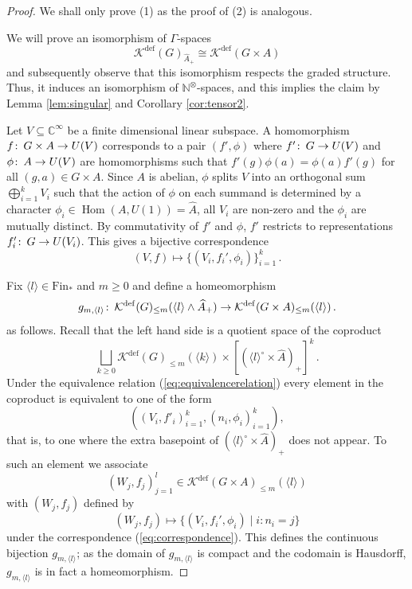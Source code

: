 \documentclass[10pt,a4paper]{amsart}
\DeclareMathOperator{\Hom}{Hom}
\newcommand{\C}{\mathbb{C}}
\newcommand{\Fin}{\mathrm{Fin}}
\newcommand{\Kdef}{\mathcal{K}^{\mathrm{def}}}
\newcommand{\N}{\mathbb{N}}
\newcommand{\co}{\colon\thinspace}
\begin{document}
\begin{proof}
We shall only prove (1) as the proof of (2) is analogous.

We will prove an isomorphism of $\Gamma$-spaces
\[
\Kdef(G)_{\widehat{A}_+} \cong \Kdef(G\times A) 
\]
and subsequently observe that this isomorphism respects the graded structure. Thus, it induces an isomorphism of $\N^\otimes$-spaces, and this implies the claim by Lemma \ref{lem:singular} and Corollary \ref{cor:tensor2}.



Let $V\subseteq\C^\infty$ be a finite dimensional linear subspace. A homomorphism $f\co G\times A\to U(V)$ corresponds to a pair $(f',\phi)$ where $f'\co G\to U(V)$ and $\phi \co A\to U(V)$ are homomorphisms such that $f'(g)\phi(a)=\phi(a)f'(g)$ for all $(g,a)\in G\times A$. Since $A$ is abelian, $\phi$ splits $V$ into an orthogonal sum $\bigoplus_{i=1}^k V_i$ such that the action of $\phi$ on each summand is determined by a character $\phi_i\in \Hom(A,U(1))=\widehat{A}$, all $V_i$ are non-zero and the $\phi_i$ are mutually distinct. By commutativity of $f'$ and $\phi$, $f'$ restricts to representations $f_i'\co G\to U(V_i)$. This gives a bijective correspondence
\begin{equation} \label{eq:correspondence}
(V,f)\mapsto \{(V_i,f_i',\phi_i)\}_{i=1}^k\, .
\end{equation}





Fix $\langle l\rangle \in \Fin_\ast$ and $m\geq 0$ and define a homeomorphism
\[
g_{m,\langle l\rangle}\co \Kdef(G)_{\leq m}(\langle l\rangle\wedge \widehat{A}_+) \to \Kdef(G\times A)_{\leq m}(\langle l\rangle)\,.
\]
as follows. Recall that the left hand side is a quotient space of the coproduct
\[
\bigsqcup_{k\geq 0} \Kdef(G)_{\leq m}(\langle k\rangle) \times [(\langle l \rangle^\circ \times \widehat{A})_{+}]^k\,.
\]
Under the equivalence relation (\ref{eq:equivalencerelation}) every element in the coproduct is equivalent to one of the form
\[
((V_i,f'_i)_{i=1}^k,(n_i,\phi_i)_{i=1}^k),
\]
that is, to one where the extra basepoint of $(\langle l\rangle^\circ \times \widehat{A})_+$ does not appear. To such an element we associate
\[
(W_j,f_j)_{j=1}^l \in \Kdef(G\times A)_{\leq m}(\langle l\rangle)
\]
with $(W_j,f_j)$ defined by
\[
(W_j,f_j) \mapsto \{(V_i,f_i',\phi_i)\mid i: n_i=j\}
\]
under the correspondence (\ref{eq:correspondence}). This defines the continuous bijection $g_{m,\langle l\rangle}$; as the domain of $g_{m,\langle l\rangle}$ is compact and the codomain is Hausdorff, $g_{m,\langle l\rangle}$ is in fact a homeomorphism.


\end{proof}
\end{document}

